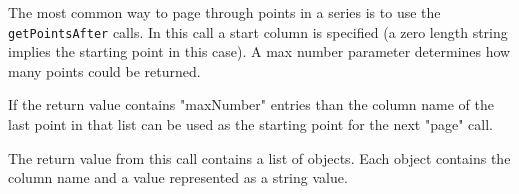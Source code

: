 The most common way to page through points in a series is to use the \verb+getPointsAfter+ calls. In this call
a start column is specified (a zero length string implies the starting point in this case). A max number parameter
determines how many points could be returned.

If the return value contains "maxNumber" entries than the column name of the last point in that list can be
used as the starting point for the next "page" call.

The return value from this call contains a list of objects. Each object contains the column name and a value represented
as a string value.
